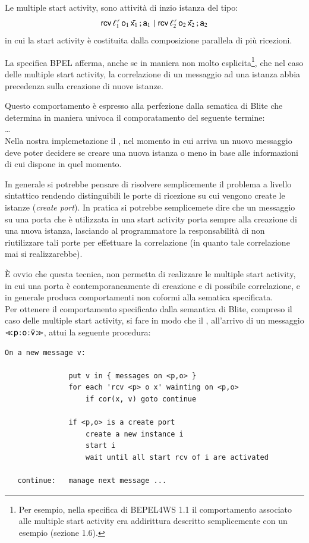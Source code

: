 Le multiple start activity, sono attività di inzio istanza del tipo:
$$
	{\sf rcv}\,\ell^{\,r}_1\, {\sf o}_1\, \bar{{\sf x}_1} \, ; {\sf a}_1 
	\, \,|\, \, 
	{\sf rcv}\,\ell^{\,r}_2\, {\sf o}_2\, \bar{{\sf x}_2} \, ; {\sf a}_2
$$
in cui la start activity è costituita dalla composizione parallela di più
ricezioni. 

La specifica BPEL afferma, anche se in maniera non molto esplicita\footnote{Per
esempio, nella specifica di BEPEL4WS 1.1 \cite{BPEL11Spec} il comportamento
associato alle multiple start activity era addirittura descritto semplicemente
con un esempio (sezione 1.6).}, che nel caso delle multiple start activity, la
correlazione di un messaggio ad una istanza abbia precedenza sulla creazione di
nuove istanze.

Questo comportamento è espresso alla perfezione dalla sematica di Blite che
determina in maniera univoca il comporatamento del seguente termine:\\
\ldots
\\

Nella nostra implemetazione il , nel momento in cui arriva
un nuovo messaggio deve poter decidere se creare una nuova istanza o meno in
base alle informazioni di cui dispone in quel momento.

In generale si potrebbe pensare di risolvere semplicemente il problema a livello
sintattico rendendo distinguibili le porte di
ricezione su cui vengono create le istanze (\emph{create port}). In pratica si
potrebbe semplicemete dire che un messaggio su una porta che è utilizzata in
una start activity porta sempre alla creazione di una nuova istanza, lasciando
al programmatore la responsabilità di non riutilizzare tali porte per
effettuare la correlazione (in quanto tale correlazione mai si realizzarebbe).

\`E ovvio che questa tecnica, non permetta di realizzare le multiple
start activity, in cui una porta è contemporaneamente di creazione e di possibile
correlazione, e in generale produca comportamenti non coformi alla sematica
specificata.
\\

Per ottenere il comportamento specificato dalla semantica di
Blite, compreso il caso delle multiple start activity, si fare in modo
che il , all'arrivo di un messaggio
$\ll\!{{\sf p}}\! : \! {\sf o}\! : \! \bar{{\sf v}}\!\gg$,  attui la seguente procedura:
\begin{verbatim}
On a new message v:

               put v in { messages on <p,o> } 
               for each 'rcv <p> o x' wainting on <p,o>
                   if cor(x, v) goto continue

               if <p,o> is a create port 
                   create a new instance i
                   start i
                   wait until all start rcv of i are activated
               
   continue:   manage next message ...  
\end{verbatim}

